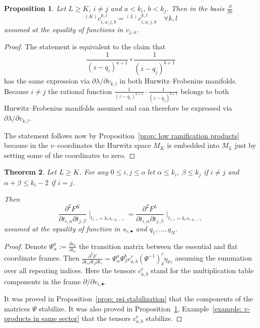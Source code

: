 \documentclass[12pt,a4paper]{amsart}
\newcommand{\p}{{\partial}}
\newcommand{\<}{\left<}
\renewcommand{\>}{\right>}
\newtheorem{theorem}{Theorem}[section]
\newtheorem{proposition}[theorem]{Proposition}
\numberwithin{equation}{section}
\begin{document}
\begin{proposition}\label{prop: v-product stabilization}
    Let $L \ge K$, $i \neq j$ and $a < k_i$, $b < k_j$. Then in the basis $ \frac{\p}{\p v}$
    \[
        {}^{(K)}c_{i,a;j,b}^{k,l} = {}^{(L)}c_{i,a;j,b}^{k,l} \quad \forall k,l
    \]
    assumed at the equality of functions in $v_{j,\alpha}$.
\end{proposition}
\begin{proof}
    The statement is equivalent to the claim that
    \[
        \frac{1}{(z - q_i)^{a+1}} \circ \frac{1}{(z - q_j)^{b+1}}
    \]
    has the same expression via $\p \lambda / \p v_{k,l}$ in both Hurwitz--Frobenius manifolds. Because $i \neq j$ the rational function $\frac{1}{(z - q_i)^{a+1}} \cdot \frac{1}{(z - q_j)^{b+1}}$ belongs to both Hurwitz--Frobenius manifolds assumed and can therefore be expressed via $\p \lambda / \p v_{k,l}$.    
    
    The statement follows now by Proposition~\ref{prop: low ramification products} because in the $v$--coordinates the Hurwitz space $M_K$ is embedded into $M_L$ just by setting some of the coordinates to zero.
\end{proof}

\begin{theorem}\label{theorem: stabilization}
    Let $L \ge K$. For any $0 \le i,j \le o$ let $\alpha \le k_i$, $\beta \le k_j$ if $i \neq j$ and $\alpha+\beta \le k_i-2$ if $i=j$. 
    
    Then
    \[
        \frac{\p^2 F^{K}}{\p t_{i,\alpha} \p t_{j,\beta}} \mid_{t_{r,\gamma} = k_r s_{r,k_r-\gamma}}
        =
        \frac{\p^2 F^{L}}{\p t_{i,\alpha} \p t_{j,\beta}} \mid_{t_{r,\gamma} = k_r s_{r,k_r-\gamma}}
    \]
    assumed at the equality of function in $s_{r,\bullet}$ and $q_1,\dots,q_N$.
\end{theorem}
\begin{proof}
    Denote $\Psi_{\alpha}^a := \frac{\p v_a}{\p t_\alpha}$ the transition matrix between the essential and flat coordinate frames. Then $\frac{\p^3 F}{\p t_\alpha \p t_\beta \p t_\gamma} = \Psi_{\alpha}^a \Psi_{\beta}^b c_{a,b}^r (\Psi^{-1})_\delta^r \eta_{\delta \gamma}$ assuming the summation over all repeating indices. Here the tensors $c_{a,b}^r$ stand for the multiplication table components in the frame $\p / \p v_{i,\bullet}$.
    
    It was proved in Proposition~\ref{prop: psi stabilization} that the components of the matrices $\Psi$ stabilize. It was also proved in Proposition~\ref{prop: v-product stabilization}, Example~\ref{example: v-products in same sector} that the tensors $c_{a,b}^r$ stabilize. 
\end{proof}
\end{document}
